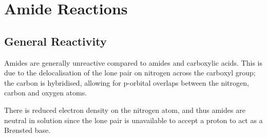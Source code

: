




	\pagebreak
	\section{Amide Reactions}

		\subsection{General Reactivity}

			Amides are generally unreactive compared to amides and carboxylic acids. This is due to the delocalisation of the lone pair
			on nitrogen across the carboxyl group; the carbon is \sptwo hybridised, allowing for p-orbital overlaps between the nitrogen,
			carbon and oxygen atoms.

			There is reduced electron density on the nitrogen atom, and thus amides are neutral in solution since the lone pair is unavailable
			to accept a proton to act as a Brønsted base.



